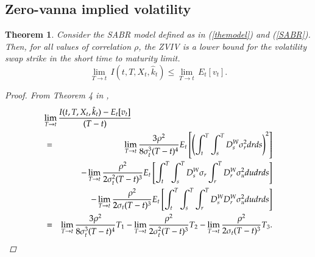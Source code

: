 \documentclass[11pt]{article}
\newtheorem{theorem}{Theorem}
\begin{document}
\subsection{Zero-vanna implied volatility}
\begin{theorem} Consider the SABR model defined as in (\ref{themodel}) and (\ref{SABR}). Then, for all values of correlation $\rho$, the ZVIV is a lower bound for the volatility swap strike in the short time to maturity limit.
\begin{equation}
\lim_{T \to t} \, I(t,T,X_t,\hat{k}_t) \leq \lim_{T \to t} \,  E_{t}[v_{t}].
\end{equation}
\begin{proof}
From Theorem 4 in \cite{ARS},
\begin{eqnarray}
\label{lim1}
\lefteqn{\lim_{T\rightarrow t}\frac{I( t,T,X_t,\hat{k}_t) -E_{t}[v_{t}]} {(T-t)}}\nonumber \\
&=& \lim_{T\rightarrow t}\frac{3\rho^{2}}{8\sigma _{t}^{3}(T-t)^{4}}
E_{t}\left[\left(\int_{t}^{T}\int_{s}^{T}D_{s}^{W}\sigma _{r}^{2}dr ds\right)^{2} \right]\nonumber\\
&&-\lim_{T\rightarrow t}\frac{\rho ^{2}}{{2\sigma _{t}^2(T-t)^{3}}}
E_{t}\left[ \int_{t}^{T} \int_{s}^{T}D_{s}^{W}\sigma_{r} \int_{r}^{T}D_{r}^{W}\sigma _{u}^{2}du dr ds\right]\nonumber\\
&&-\lim_{T\rightarrow t}\frac{\rho ^{2}}{2\sigma _{t}(T-t)^{3}}
E_{t}\left[\int_{t}^{T} \int_{s}^{T}\int_{r}^{T}D_{s}^{W}D_{r}^{W}\sigma _{u}^{2}du dr ds\right]\nonumber\\
&=& \lim_{T\rightarrow t}\frac{3\rho^{2}}{8\sigma _{t}^{3}(T-t)^{4}}T_1 - \lim_{T\rightarrow t}\frac{\rho ^{2}}{{2\sigma _{t}^2(T-t)^{3}}} T_2 - \lim_{T\rightarrow t}\frac{\rho ^{2}}{2\sigma _{t}(T-t)^{3}} T_3.
\end{eqnarray}

\end{proof}
\end{theorem}
\end{document}

